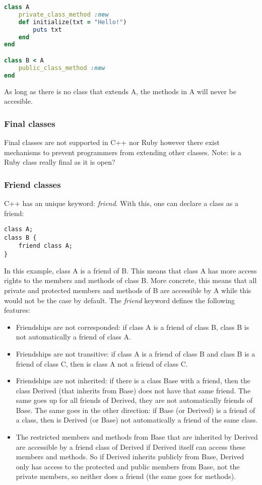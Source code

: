 \documentclass[10pt,a4paper,twocolumn]{article}
\begin{document}
\begin{lstlisting}[language=Ruby]
class A
	private_class_method :new
	def initialize(txt = "Hello!")
		puts txt
	end
end

class B < A
	public_class_method :new
end
\end{lstlisting}

As long as there is no class that extends A, the methods in A will never be accesible.

\subsubsection{Final classes}
Final classes are not supported in C++ nor Ruby however there exist mechanisms to prevent programmers from extending other classes. Note: is a Ruby class really final as it is open?

\subsubsection{Friend classes}
C++ has an unique keyword: \textit{friend}. With this, one can declare a class as a friend:

\begin{lstlisting}
class A;
class B {
	friend class A;
}
\end{lstlisting}

In this example, class A is a friend of B. This means that class A has more access rights to the members and methods of class B. More concrete, this means that all private and protected members and methods of B are accessible by A while this would not be the case by default. The \textit{friend} keyword defines the following features:

\begin{itemize}
\item Friendships are not corresponded: if class A is a friend of class B, class B is not automatically a friend of class A.
\item Friendships are not transitive: if class A is a friend of class B and class B is a friend of class C, then is class A not a friend of class C.
\item Friendships are not inherited: if there is a class Base with a friend, then the class Derived (that inherits from Base) does not have that same friend. The same goes up for all friends of Derived, they are not automatically friends of Base. The same goes in the other direction: if Base (or Derived) is a friend of a class, then is Derived (or Base) not automatically a friend of the same class.
\item The restricted members and methods from Base that are inherited by Derived are accessible by a friend class of Derived if Derived itself can access these members and methods. So if Derived inherits publicly from Base, Derived only has access to the protected and public members from Base, not the private members, so neither does a friend (the same goes for methods).
\end{itemize}
\end{document}
